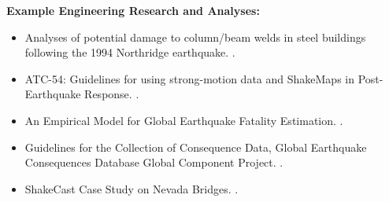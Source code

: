\documentclass[letterpaper,10pt,english]{sphinxmanual}
\begin{document}
\textbf{Example Engineering Research and Analyses:}
\begin{itemize}
\item {} 
Analyses of potential damage to column/beam welds in steel
buildings following the 1994 Northridge earthquake. {\hyperref[references:atc2002]{}}.

\item {} 
ATC-54: Guidelines for using strong-motion data and ShakeMaps in
Post-Earthquake Response.  {\hyperref[references:atc2002]{}}.

\item {} 
An Empirical Model for Global Earthquake Fatality
Estimation. {\hyperref[references:jaiswal2010]{}}.

\item {} 
Guidelines for the Collection of Consequence Data, Global Earthquake Consequences Database Global
Component Project. {\hyperref[references:pomonis2011]{}}.

\item {} 
ShakeCast Case Study on Nevada Bridges. {\hyperref[references:biasi2016]{}}.

\end{itemize}
\end{document}
